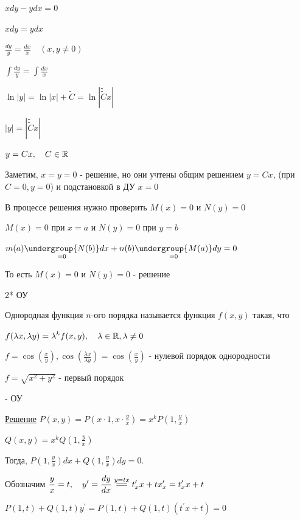 \documentclass[12pt]{article}
\begin{document}
    \Ex $xdy - ydx = 0$

    $xdy = ydx$

    $\displaystyle \frac{dy}{y} = \frac{dx}{x} \quad (x, y \neq 0)$

    $\displaystyle \int \frac{dy}{y} = \int \frac{dx}{x}$

    $\ln|y| = \ln|x| + \tilde{C} = \ln|\tilde{\tilde{C}}x|$

    $|y| = |\tilde{\tilde{C}}x|$

    $y = Cx, \quad C \in \mathbb{R}$

    Заметим, $x = y = 0$ - решение, но они учтены общим решением $y = Cx$, (при $C = 0, y = 0$) и подстановкой в ДУ $x = 0$

    \Nota В процессе решения нужно проверить $M(x) = 0$ и $N(y) = 0$

    $M(x) = 0$ при $x = a$ и $N(y) = 0$ при $y = b$

    $m(a)\underset{=0}{\undergroup{N(b)}}dx + n(b)\underset{=0}{\undergroup{M(a)}}dy = 0$

    То есть $M(x) = 0$ и $N(y) = 0$ - решение

    2* ОУ

     Однородная функция $n$-ого порядка называется функция $f(x, y)$ такая, что

    $\displaystyle f(\lambda x, \lambda y) = \lambda^k f(x, y), \quad \lambda \in \mathbb{R}, \lambda \neq 0$

    \Ex $\displaystyle f = \cos\left(\frac{x}{y}\right), \cos(\frac{\lambda x}{\lambda y}) = \cos(\frac{x}{y})$ - нулевой порядок однородности

    $\displaystyle f = \sqrt{x^2 + y^2}$ - первый порядок

      - ОУ

    \underline{Решение} $\displaystyle P(x, y) = P\left(x \cdot 1, x \cdot \frac{y}{x}\right) = x^k P\left(1, \frac{y}{x}\right)$

    $\displaystyle Q(x, y) = x^k Q\left(1, \frac{y}{x}\right)$

    Тогда, $\displaystyle P\left(1, \frac{y}{x}\right)dx + Q\left(1, \frac{y}{x}\right)dy = 0$.

    Обозначим $\displaystyle \frac{y}{x} = t, \quad y^\prime = \frac{dy}{dx} \stackrel{y = tx}{=\joinrel=} t^\prime_x x + t x^\prime_x = t^\prime_x x + t$

    $\displaystyle P(1, t) + Q(1, t)y^\prime = P(1, t) + Q(1, t)(t^\prime x + t) = 0$
\end{document}
